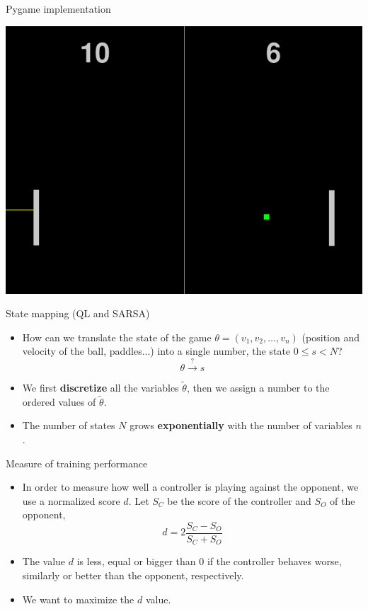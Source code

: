 \documentclass[serif, 11pt]{beamer}
\begin{document}
\begin{frame}{Pygame implementation}
	\begin{center}
		\includegraphics[width=.8\linewidth]{pong-QL3.png}
	\end{center}
\end{frame}

\begin{frame}{State mapping (QL and SARSA)}
	\begin{itemize}
		\item How can we translate the state of the game $\theta = (v_1, v_2, 
			\ldots, v_n)$ (position and velocity of the ball, paddles...) into a 
			single number, the state $0 \le s < N$?
			$$ \theta \xrightarrow{?} s $$

		\item We first \textbf{discretize} all the variables $\tilde \theta$, then 
			we assign a number to the ordered values of $\tilde \theta$.

		\item The number of states $N$ grows \textbf{exponentially} with the number of 
			variables $n$.
	\end{itemize}
\end{frame}

\begin{frame}{Measure of training performance}
	\begin{itemize}
		\item In order to measure how well a controller is playing against the 
			opponent, we use a normalized score $d$. Let $S_C$ be the score of the 
			controller and $S_O$ of the opponent,
			$$ d = 2 \frac{S_C - S_O}{S_C + S_O} $$

		\item The value $d$ is less, equal or bigger than $0$ if the controller 
			behaves worse, similarly or better than the opponent, respectively.
		\item We want to maximize the $d$ value.
	\end{itemize}
\end{frame}
\end{document}
